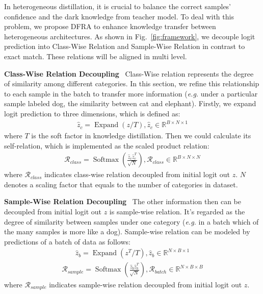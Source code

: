 \label{sec:DFRA}
In heterogeneous distillation, it is crucial to balance the correct samples' confidence and the dark knowledge from teacher model. To deal with this problem, we propose DFRA to enhance knowledge transfer between heterogeneous architectures. As shown in Fig.~\ref{fig:framework}, we decouple logit prediction into Class-Wise Relation and Sample-Wise Relation in contrast to exact match. These relations will be aligned in multi level. 

\textbf{Class-Wise Relation Decoupling} \ Class-Wise relation represents the degree of similarity among different categories. In this section, we refine this relationship to each sample in the batch to transfer more information (\emph{e.g.} under a particular sample labeled dog, the similarity between cat and elephant). Firstly, we expand logit prediction to three dimensions, which is defined as:
\begin{equation}
    \begin{aligned}
        \hat{z}_{c} = \operatorname{Expand}(z/T), \hat{z}_{c} \in \mathbb{R}^{B\times N\times 1}
    \end{aligned}
\end{equation}
where $T$ is the soft factor in knowledge distillation. 
Then we could calculate its self-relation, which is implemented as the scaled product relation:
\begin{equation}
    \begin{aligned}
        \mathcal{R}_{class} =\operatorname{Softmax} \left(\frac{\hat{z}_{c} \hat{z}_{c}^{T}}{\sqrt{N}}\right), \mathcal{R}_{class} \in \mathbb{R}^{B\times N\times N}
    \end{aligned}
\end{equation}
where $\mathcal{R}_{class}$ indicates class-wise relation decoupled from initial logit out $z$. $N$ denotes a scaling factor that equals to the number of categories in dataset.

\textbf{Sample-Wise Relation Decoupling} \ The other information then can be decoupled from initial logit out $z$ is sample-wise relation. It's regarded as the degree of similarity between samples under one category (\emph{e.g.} in a batch which of the many samples is more like a dog). Sample-wise relation can be modeled by predictions of a batch of data as follows:
\begin{equation}
    \begin{aligned}
        \hat{z}_{b} = \operatorname{Expand}(z^{T}/T), \hat{z}_{b} \in \mathbb{R}^{N\times B\times 1}
    \end{aligned}
\end{equation}
\begin{equation}
    \begin{aligned}
        \mathcal{R}_{sample} = \operatorname{Softmax}\left(\frac{\hat{z}_{b} \hat{z}_{b}^{T}}{\sqrt{N}}\right), \mathcal{R}_{batch} \in \mathbb{R}^{N\times B\times B}
    \end{aligned}
\end{equation}
where $\mathcal{R}_{sample}$ indicates sample-wise relation decoupled from initial logit out $z$.



